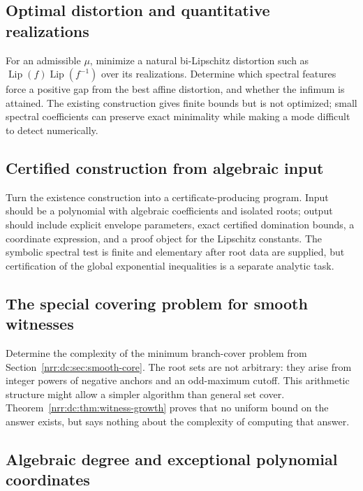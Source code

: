 \documentclass[11pt,letterpaper]{article}
\theoremstyle{definition}
\theoremstyle{remark}
\begin{document}
\subsection{Optimal distortion and quantitative realizations}

For an admissible $\mu$, minimize a natural bi-Lipschitz distortion
such as $\operatorname{Lip}(f)\operatorname{Lip}(f^{-1})$ over its
realizations. Determine which spectral features force a positive gap
from the best affine distortion, and whether the infimum is attained.
The existing construction gives finite bounds but is not optimized;
small spectral coefficients can preserve exact minimality while
making a mode difficult to detect numerically.

\subsection{Certified construction from algebraic input}

Turn the existence construction into a certificate-producing program.
Input should be a polynomial with algebraic coefficients and isolated
roots; output should include explicit envelope parameters, exact
certified domination bounds, a coordinate expression, and a proof
object for the Lipschitz constants. The symbolic spectral test is
finite and elementary after root data are supplied, but certification
of the global exponential inequalities is a separate analytic task.

\subsection{The special covering problem for smooth witnesses}

Determine the complexity of the minimum branch-cover problem from
Section~\ref{nrr:dc:sec:smooth-core}. The root sets are not arbitrary:
they arise from integer powers of negative anchors and an odd-maximum
cutoff. This arithmetic structure might allow a simpler algorithm
than general set cover. Theorem~\ref{nrr:dc:thm:witness-growth} proves that
no uniform bound on the answer exists, but says nothing about the
complexity of computing that answer.

\subsection{Algebraic degree and exceptional polynomial coordinates}
\label{nrr:ed:q-degree}
\end{document}
